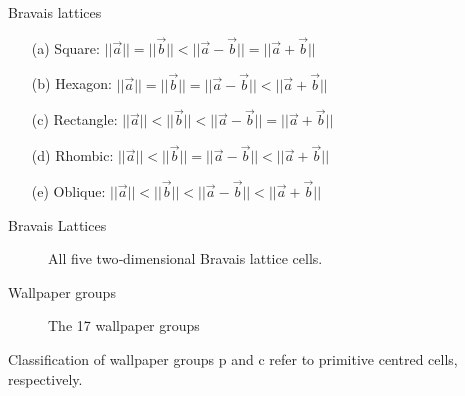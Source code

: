 \documentclass{beamer}
\begin{document}
\begin{frame}{Bravais lattices}
    \begin{enumerate}
        \item[(a)] Square:\hspace*{14pt} $||\vec{a}||=||\vec{b}|| < ||\vec{a}-\vec{b}|| = ||\vec{a}+\vec{b}||$

        \item[(b)] Hexagon:\hspace*{6pt} $||\vec{a}||=||\vec{b}|| = ||\vec{a}-\vec{b}|| < ||\vec{a}+\vec{b}||$

        \item[(c)] Rectangle: $||\vec{a}||<||\vec{b}|| < ||\vec{a}-\vec{b}|| = ||\vec{a}+\vec{b}||$

        \item[(d)] Rhombic:\hspace*{6pt} $||\vec{a}||<||\vec{b}|| = ||\vec{a}-\vec{b}|| < ||\vec{a}+\vec{b}||$

        \item[(e)] Oblique:\hspace*{11pt} $||\vec{a}||<||\vec{b}|| < ||\vec{a}-\vec{b}|| < ||\vec{a}+\vec{b}||$
    \end{enumerate}
\end{frame}

\begin{frame}{Bravais Lattices}
    \begin{figure}
        \centering
        
        \caption{All five two‐dimensional Bravais lattice cells.}
        \label{fig:bravis-lattices}
    \end{figure}
\end{frame}



\begin{frame}{Wallpaper groups}
    \begin{figure}
        \centering
        
        \caption{The 17 wallpaper groups }
        \label{fig:17WallpaperGroups}
    \end{figure}
\end{frame}

\begin{frame}{Classification of wallpaper groups}
    p and c refer to primitive centred cells, respectively.

\end{frame}
\end{document}
